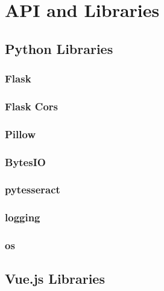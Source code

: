 \chapter{API and Libraries}
\label{chap:API_Libaryies}


\section{Python Libraries}

\subsection{Flask}

\subsection{Flask Cors}

\subsection{Pillow}

\subsection{BytesIO}

\subsection{pytesseract}

\subsection{logging}

\subsection{os}




\section{Vue.js Libraries}

